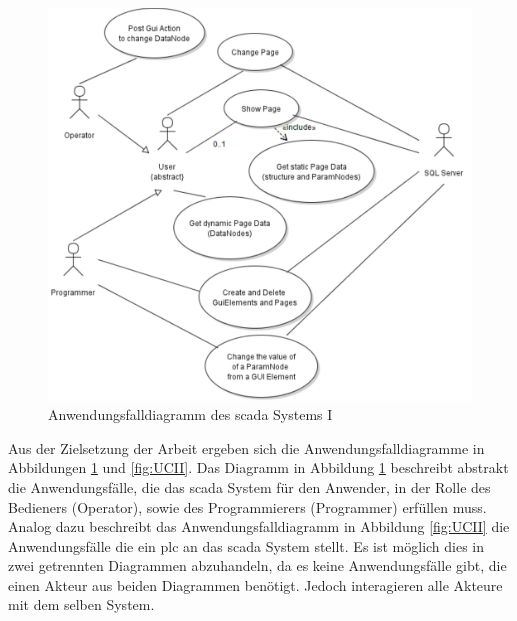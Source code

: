 \begin{figure}[b]
  \centering
  \includegraphics[width=\textwidth]{content/hauptteil/systemEntwurf/res/useCase/I.pdf}
  \caption[Anwendungsfalldiagramm des \acs{scada} Systems I]{Anwendungsfalldiagramm des \acs{scada} Systems I}
  \label{fig:UCI}
\end{figure}
Aus der Zielsetzung der Arbeit ergeben sich die Anwendungsfalldiagramme in Abbildungen \ref{fig:UCI} und \ref{fig:UCII}.
Das Diagramm in Abbildung \ref{fig:UCI} beschreibt abstrakt die Anwendungsfälle, die das \ac{scada} System für den Anwender, in der Rolle des Bedieners (Operator), 
sowie des Programmierers (Programmer) erfüllen muss.
Analog dazu beschreibt das Anwendungsfalldiagramm in Abbildung \ref{fig:UCII} die Anwendungsfälle die ein \ac{plc} an das \ac{scada} System stellt.
Es ist möglich dies in zwei getrennten Diagrammen abzuhandeln, da es keine Anwendungsfälle gibt, die einen Akteur aus beiden Diagrammen benötigt.
Jedoch interagieren alle Akteure mit dem selben System.

